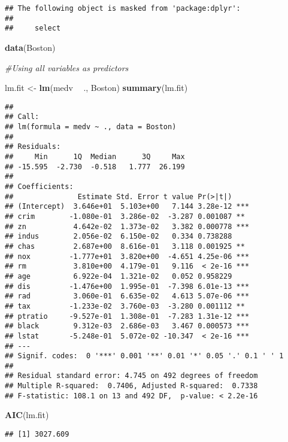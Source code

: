 \documentclass[]{article}
\newenvironment{Shaded}{\begin{snugshade}}{\end{snugshade}}
\newcommand{\CommentTok}[1]{\textcolor[rgb]{0.56,0.35,0.01}{\textit{#1}}}
\newcommand{\KeywordTok}[1]{\textcolor[rgb]{0.13,0.29,0.53}{\textbf{#1}}}
\newcommand{\NormalTok}[1]{#1}
\newcommand{\OperatorTok}[1]{\textcolor[rgb]{0.81,0.36,0.00}{\textbf{#1}}}
\newcommand{\StringTok}[1]{\textcolor[rgb]{0.31,0.60,0.02}{#1}}
\begin{document}
\begin{verbatim}
## The following object is masked from 'package:dplyr':
## 
##     select
\end{verbatim}

\begin{Shaded}
\begin{Highlighting}[]
\KeywordTok{data}\NormalTok{(Boston)}

\CommentTok{#Using all variables as predictors}

\NormalTok{lm.fit <-}\StringTok{ }\KeywordTok{lm}\NormalTok{(medv }\OperatorTok{~}\StringTok{ }\NormalTok{., Boston)}
\KeywordTok{summary}\NormalTok{(lm.fit)}
\end{Highlighting}
\end{Shaded}

\begin{verbatim}
## 
## Call:
## lm(formula = medv ~ ., data = Boston)
## 
## Residuals:
##     Min      1Q  Median      3Q     Max 
## -15.595  -2.730  -0.518   1.777  26.199 
## 
## Coefficients:
##               Estimate Std. Error t value Pr(>|t|)    
## (Intercept)  3.646e+01  5.103e+00   7.144 3.28e-12 ***
## crim        -1.080e-01  3.286e-02  -3.287 0.001087 ** 
## zn           4.642e-02  1.373e-02   3.382 0.000778 ***
## indus        2.056e-02  6.150e-02   0.334 0.738288    
## chas         2.687e+00  8.616e-01   3.118 0.001925 ** 
## nox         -1.777e+01  3.820e+00  -4.651 4.25e-06 ***
## rm           3.810e+00  4.179e-01   9.116  < 2e-16 ***
## age          6.922e-04  1.321e-02   0.052 0.958229    
## dis         -1.476e+00  1.995e-01  -7.398 6.01e-13 ***
## rad          3.060e-01  6.635e-02   4.613 5.07e-06 ***
## tax         -1.233e-02  3.760e-03  -3.280 0.001112 ** 
## ptratio     -9.527e-01  1.308e-01  -7.283 1.31e-12 ***
## black        9.312e-03  2.686e-03   3.467 0.000573 ***
## lstat       -5.248e-01  5.072e-02 -10.347  < 2e-16 ***
## ---
## Signif. codes:  0 '***' 0.001 '**' 0.01 '*' 0.05 '.' 0.1 ' ' 1
## 
## Residual standard error: 4.745 on 492 degrees of freedom
## Multiple R-squared:  0.7406, Adjusted R-squared:  0.7338 
## F-statistic: 108.1 on 13 and 492 DF,  p-value: < 2.2e-16
\end{verbatim}

\begin{Shaded}
\begin{Highlighting}[]
\KeywordTok{AIC}\NormalTok{(lm.fit)}
\end{Highlighting}
\end{Shaded}

\begin{verbatim}
## [1] 3027.609
\end{verbatim}
\end{document}
